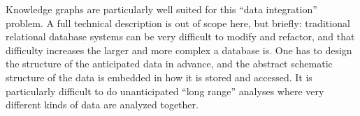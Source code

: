 \documentclass{article}
\begin{document}
Knowledge graphs are particularly well suited for this ``data
integration'' problem. A full technical description is out of scope
here, but briefly: traditional relational database systems can be very
difficult to modify and refactor, and that difficulty increases the
larger and more complex a database is. One has to design the structure of the anticipated
data in advance, and the abstract schematic structure of the data is
embedded in how it is stored and accessed. It is particularly difficult
to do unanticipated ``long range'' analyses where very different kinds
of data are analyzed together.
\end{document}
